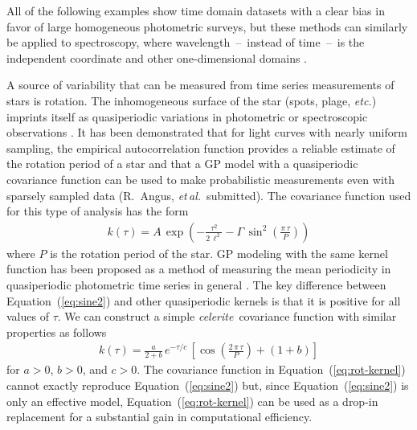\documentclass[manuscript, letterpaper]{aastex6}
\makeatletter
\let\origsubsection\subsection
\renewcommand\subsection{\@ifstar{\starsubsection}{\nostarsubsection}}
\newcommand\nostarsubsection[1]{\subsectionprelude\origsubsection{#1}}
\newcommand\starsubsection[1]{\subsectionprelude\origsubsection*{#1}}
\newcommand\subsectionprelude{\vspace{1em}}
\newcommand{\celeriteterm}{\emph{celerite}}
\newcommand{\foreign}[1]{\emph{#1}}
\newcommand{\etal}{\foreign{et\,al.}}
\newcommand{\etc}{\foreign{etc.}}
\renewcommand{\eqref}[1]{\ref{eq:#1}}
\newcommand{\Eq}[1]{Equation~(\eqref{#1})}
\newcommand{\eq}[1]{\Eq{#1}}
\newcommand{\eqlabel}[1]{\label{eq:#1}}
\newcommand{\sectlabel}[1]{\label{sect:#1}}
\makeatother
\begin{document}
All of the following examples show time domain datasets with a clear bias in
favor of large homogeneous photometric surveys, but these methods can
similarly be applied to spectroscopy, where wavelength~--~instead of
time~--~is the independent coordinate and other one-dimensional domains
\citep[see][for a potential application]{Czekala:2017}.

\subsection{Stellar rotation} \sectlabel{rotation}

A source of variability that can be measured from time series measurements of
stars is rotation.
The inhomogeneous surface of the star (spots, plage, \etc) imprints itself as
quasiperiodic variations in photometric or spectroscopic observations
\citep{Dumusque:2014}.
It has been demonstrated that for light curves with nearly uniform sampling,
the empirical autocorrelation function provides a reliable estimate of the
rotation period of a star \citep{Mcquillan:2013, Mcquillan:2014, Aigrain:2015}
and that a GP model with a
quasiperiodic covariance function can be used to make probabilistic
measurements even with sparsely sampled data (R.~Angus, \etal\ submitted).
The covariance function used for this type of analysis has the form
\begin{eqnarray}\eqlabel{sine2}
k(\tau) = A\,\exp\left(-\frac{\tau^2}{2\,\ell^2} -
    \Gamma\,\sin^2\left(\frac{\pi\,\tau}{P} \right) \right)
\end{eqnarray}
where $P$ is the rotation period of the star.
GP modeling with the same kernel function has been proposed as a method of
measuring the mean periodicity in quasiperiodic photometric time series in
general \citep{Wang:2012}.
The key difference between \eq{sine2} and other quasiperiodic kernels is that
it is positive for all values of $\tau$.
We can construct a simple \celeriteterm\ covariance function with similar properties
as follows
\begin{eqnarray}\eqlabel{rot-kernel}
k(\tau) = \frac{a}{2+b}\,e^{-\tau/c}\,\left[
    \cos\left(\frac{2\,\pi\,\tau}{P}\right) + (1 + b)
\right]
\end{eqnarray}
for $a>0$, $b>0$, and $c>0$.
The covariance function in \eq{rot-kernel} cannot exactly reproduce \eq{sine2}
but, since \eq{sine2} is only an effective model, \eq{rot-kernel} can be used
as a drop-in replacement for a substantial gain in computational efficiency.
\end{document}
